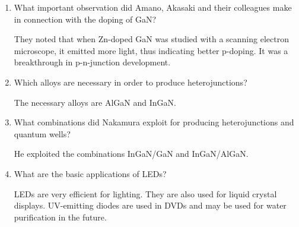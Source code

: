 \documentclass[a4paper, 12pt]{article}
\begin{document}
\begin{enumerate}[label=\alph*)]
	\item What important observation did Amano, Akasaki and their colleagues make in connection with the doping of GaN?

		They noted that when Zn-doped GaN was studied with a scanning 
		electron microscope, it emitted more light, thus indicating better 
		p-doping. It was a breakthrough in p-n-junction development.

	\item Which alloys are necessary in order to produce heterojunctions?

		The necessary alloys are AlGaN and InGaN.

	\item What combinations did Nakamura exploit for producing heterojunctions and quantum wells?

		He exploited the combinations InGaN/GaN and InGaN/AlGaN.

	\item What are the basic applications of LEDs?

		LEDs are very efficient for lighting. They are also used for liquid 
		crystal displays. UV-emitting diodes are used in DVDs and may be 
		used for water purification in the future.
\end{enumerate}
\end{document}

